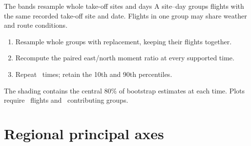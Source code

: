 \documentclass[11pt,aspectratio=169]{beamer}
\begin{document}
\begin{frame}{The bands resample whole take-off sites and days}
\small
A site--day groups flights with the same recorded take-off site and date.
Flights in one group may share weather and route conditions.
\begin{enumerate}
 \item Resample whole groups with replacement, keeping their flights together.
 \item Recompute the paired east/north moment ratio at every supported time.
 \item Repeat \StatPrelimIsoBootResamples\ times; retain the 10th and 90th percentiles.
\end{enumerate}
The shading contains the central 80\% of bootstrap estimates at each time.
Plots require \StatPrelimIsoMinFlights\ flights and
\StatPrelimIsoMinClusters\ contributing groups.
\end{frame}

\section{Regional principal axes}
\end{document}
